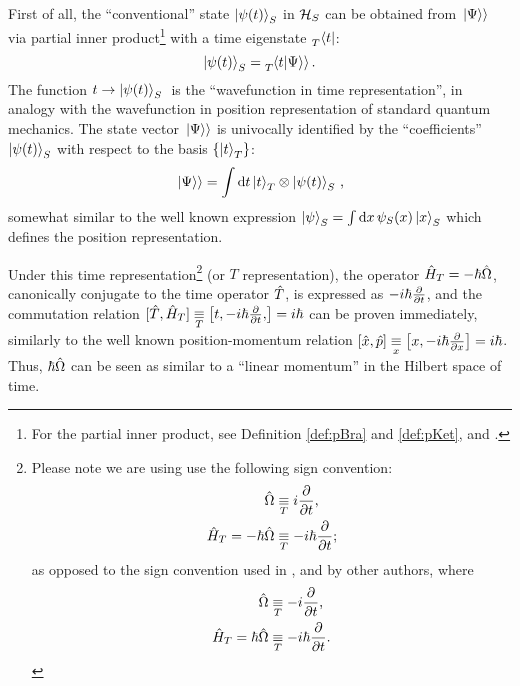 First of all, the ``conventional'' state $\ket{\psi(t)}_S$ in $\hilb{H}_S$
can be obtained from $\dket{\Psi}$ via partial inner product\footnote{
  For the partial inner product,
  see Definition \ref{def:pBra} and \ref{def:pKet},
  and \cite[.3]{QMT_Jacobs}.
}
with a time eigenstate $\prescript{}{T}{\bra{t}}$:
\begin{equation*}
  \ket{\psi(t)}_S = \prescript{}{T}{\bradket{t}{\Psi}} \, \text{.}
\end{equation*}
The function $ t \rightarrow \ket{\psi(t)}_S \; $ is the
``wavefunction in time representation'', in analogy
with the wavefunction in position representation of standard quantum mechanics.
The state vector $\dket{\Psi}$ is univocally identified by the ``coefficients'' $\ket{\psi(t)}_S$
with respect to the basis $\setof{\ket{t}_T}$:
\begin{equation}\label{eq:pw:}
  \dket{\Psi} = \int \dd{t} \ket{t}_T \ox \ket{\psi(t)}_S \, \text{,}
\end{equation}
somewhat similar to the well known expression $\ket{\psi}_S = \int \dd{x} \psi_{S}(x) \ket{x}_S$
which defines the position representation.

Under this time representation\footnote{
  Please note we are using use the following sign convention:
  \begin{align*}
    \op{\Omega} &\repr[T] i\pdv{t} \text{,} \\
    \op{H}_T = -\hbar\op{\Omega} &\repr[T] -i\hbar\pdv{t} \text{;}
  \end{align*}
  as opposed to the sign convention used in \cite{Lloyd:Time}, and by other authors, where
  \begin{align*}
    \op{\Omega} &\repr[T] -i\pdv{t} \text{,} \\
    \op{H}_T = \hbar\op{\Omega} &\repr[T] -i\hbar\pdv{t} \text{.}
  \end{align*}
}
(or $T$ representation), the operator $\op{H}_T = -\hbar\op{\Omega}$,
canonically conjugate to the time operator $\op{T}$, is expressed as $-i\hbar\pdv{t}$,
and the commutation relation
$[\op{T}, \op{H}_T] \repr[T] \comm{t, -i\hbar\pdv{t}}{} = i\hbar$
can be proven
immediately, similarly to the well known position-momentum relation
$\comm{\op{x}}{\op{p}} \repr[x] \comm{x}{-i\hbar\pdv{x}} = i\hbar$.
Thus, $\hbar\op{\Omega}$ can be seen as similar to a ``linear momentum''
in the Hilbert space of time.


